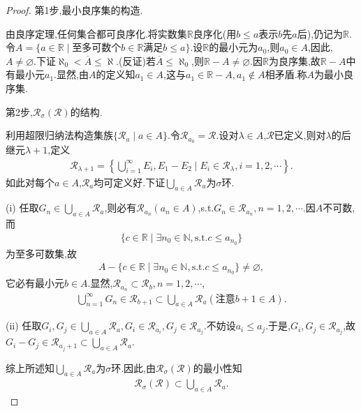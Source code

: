 \documentclass[../../main.tex]{subfiles}%
\begin{document}
\begin{proof}

第1步,最小良序集的构造.

由良序定理,任何集合都可良序化.将实数集$\mathbb{R}$良序化(用$b\leqslant a$表示$b$先$a$后),仍记为$\mathbb{R}$.令$A=\{a\in\mathbb{R}\mid$至多可数个$b\in\mathbb{R}$满足$b\leqslant a\}$.设$\mathbb{R}$的最小元为$a_0$,则$a_0\in A$,因此,$A\neq\varnothing$.下证$\aleph_0<\overline{A}\leqslant\aleph$.(反证)若$\overline{A}\leqslant\aleph_0$,则$\mathbb{R}-A\neq\varnothing$.因$\mathbb{R}$为良序集,故$\mathbb{R}-A$中有最小元$a_1$.显然,由$A$的定义知$a_1\in A$,这与$a_1\in\mathbb{R}-A,a_1\notin A$相矛盾.称$A$为最小良序集.

第2步,$\mathscr{R}_{\sigma}(\mathscr{R})$的结构.

利用超限归纳法构造集族$\{\mathscr{R}_a\mid a\in A\}$.令$\mathscr{R}_{a_0}=\mathscr{R}$.设对$\lambda\in A$,$\mathscr{R}$已定义,则对$\lambda$的后继元$\lambda+1$,定义
\begin{align*}
\mathscr{R}_{\lambda+1}=\left\{\bigcup\limits_{i=1}^{\infty}E_i,E_1-E_2\mid E_i\in\mathscr{R}_{\lambda},i=1,2,\cdots\right\}.
\end{align*}
如此对每个$a\in A$,$\mathscr{R}_a$均可定义好.下证$\bigcup\limits_{a\in A}\mathscr{R}_a$为$\sigma$环.

(i) 任取$G_n\in\bigcup\limits_{a\in A}\mathscr{R}_a$,则必有$\mathscr{R}_{a_n}(a_n\in A)$,s.t.$G_n\in\mathscr{R}_{a_n},n=1,2,\cdots$.因$A$不可数,而
\begin{align*}
\{c\in\mathbb{R}\mid \exists n_0\in\mathbb{N},\text{s.t.}c\leqslant a_{n_0}\}
\end{align*}
为至多可数集,故
\begin{align*}
A-\{c\in\mathbb{R}\mid \exists n_0\in\mathbb{N},\text{s.t.}c\leqslant a_{n_0}\}\neq\varnothing,
\end{align*}
它必有最小元$b\in A$.显然,$\mathscr{R}_{a_n}\subset\mathscr{R}_b,n=1,2,\cdots$,
\begin{align*}
\bigcup\limits_{n=1}^{\infty}G_n\in\mathscr{R}_{b+1}\subset\bigcup\limits_{a\in A}\mathscr{R}_a(\text{注意}b+1\in A).
\end{align*}

(ii) 任取$G_i,G_j\in\bigcup\limits_{a\in A}\mathscr{R}_a,G_i\in\mathscr{R}_{a_i},G_j\in\mathscr{R}_{a_j}$.不妨设$a_i\leqslant a_j$.于是,$G_i,G_j\in\mathscr{R}_{a_j}$,故$G_i-G_j\in\mathscr{R}_{a_j+1}\subset\bigcup\limits_{a\in A}\mathscr{R}_a$.

综上所述知$\bigcup\limits_{a\in A}\mathscr{R}_a$为$\sigma$环.因此,由$\mathscr{R}_{\sigma}(\mathscr{R})$的最小性知
\begin{align*}
\mathscr{R}_{\sigma}(\mathscr{R})\subset\bigcup\limits_{a\in A}\mathscr{R}_a.
\end{align*}


\end{proof}
\end{document}

